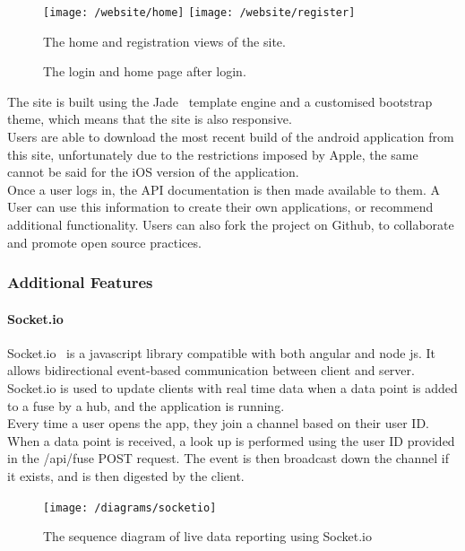 \documentclass[preprint,12pt,3p]{elsarticle}
\begin{document}
\begin{figure}[H]
    \centering
    \texttt{[image: /website/home]}
    \texttt{[image: /website/register]}
    \caption {The home and registration views of the site.}
\end{figure}
\begin{figure}[H]
    \centering

    \caption {The login and home page after login.}
\end{figure}

The site is built using the Jade~\cite{jade} template engine and a customised bootstrap~\cite{bootstrap} theme, which means that the site is also responsive.\\
Users are able to download the most recent build of the android application from this site, unfortunately due to the restrictions imposed by Apple, the same cannot be said for the iOS version of the application.\\
Once a user logs in, the API documentation is then made available to them. A User can use this information to create their own applications, or recommend additional functionality. Users can also fork the project on Github, to collaborate and promote open source practices.

\subsubsection{Additional Features}

\paragraph{Socket.io}
Socket.io~\cite{socketio} is a javascript library compatible with both angular and node js. It allows bidirectional event-based communication between client and server.\\
Socket.io is used to update clients with real time data when a data point is added to a fuse by a hub, and the application is running.\\
Every time a user opens the app, they join a channel based on their user ID. When a data point is received, a look up is performed using the user ID provided in the /api/fuse POST request. The event is then broadcast down the channel if it exists, and is then digested by the client.

\begin{figure}[H]
    \centering
    \texttt{[image: /diagrams/socketio]}

    \caption {The sequence diagram of live data reporting using Socket.io}
\end{figure}
\end{document}
